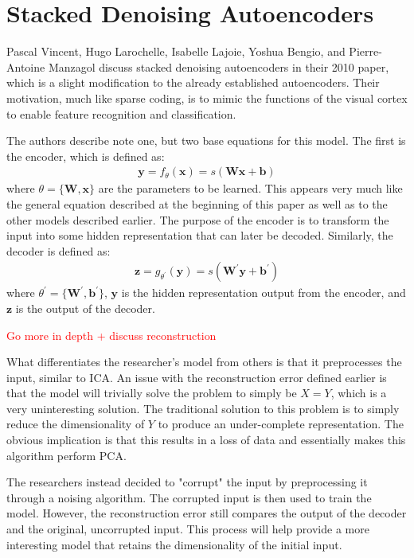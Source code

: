 \documentclass{article}
\newcommand{\vect}[1]{\mathbf{#1}}
\newcommand{\matr}[1]{\mathbf{#1}}
\newcommand{\vb}[0]{\vect{b}}
\newcommand{\vx}[0]{\vect{x}}
\newcommand{\vz}[0]{\vect{z}}
\newcommand{\vy}[0]{\vect{y}}
\newcommand{\mW}[0]{\matr{W}}
\newcommand{\todo}[1]{{\Large\textcolor{red}{#1}}}
\begin{document}
\section {Stacked Denoising Autoencoders}

Pascal Vincent, Hugo Larochelle, Isabelle Lajoie, Yoshua Bengio, and Pierre-Antoine Manzagol discuss stacked denoising autoencoders in their 2010 paper, which is a slight modification to the already established autoencoders. Their motivation, much like sparse coding, is to mimic the functions of the visual cortex to enable feature recognition and classification. 

The authors describe note one, but two base equations for this model. The first is the encoder, which is defined as:
\begin{align*}
\vy = f_\theta (\vx) = s(\mW \vx + \vb)
\end{align*}
where $\theta = \{ \mW, \vx \}$ are the parameters to be learned. This appears very much like the general equation described at the beginning of this paper as well as to the other models described earlier. The purpose of the encoder is to transform the input into some hidden representation that can later be decoded. Similarly, the decoder is defined as:
\begin{align*}
\vz = g_{\theta^{'}} (\vy) = s(\mW^{'}  \vy + \vb^{'})
\end{align*}
where $\theta^{'} = \{ \mW^{'}, \vb^{'} \}$, $\vy$ is the hidden representation output from the encoder, and $\vz$ is the output of the decoder. 

\todo {Go more in depth + discuss reconstruction}

What differentiates the researcher's model from others is that it preprocesses the input, similar to ICA. An issue with the reconstruction error defined earlier is that the model will trivially solve the problem to simply be $X = Y$, which is a very uninteresting solution. The traditional solution to this problem is to simply reduce the dimensionality of $Y$ to produce an under-complete representation. The obvious implication is that this results in a loss of data and essentially makes this algorithm perform PCA.

The researchers instead decided to "corrupt" the input by preprocessing it through a noising algorithm. The corrupted input is then used to train the model. However, the reconstruction error still compares the output of the decoder and the original, uncorrupted input. This process will help provide a more interesting model that retains the dimensionality of the initial input. 
\end{document}
